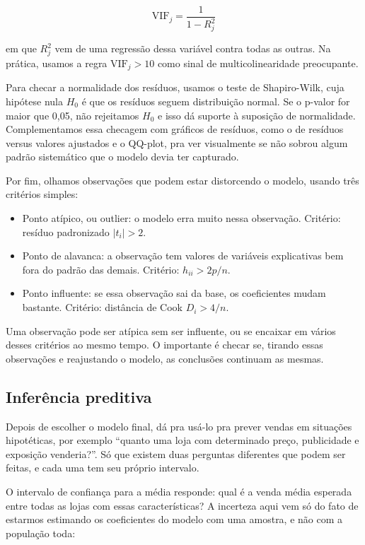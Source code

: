 \documentclass[a4paper]{modeloUFCG} %
\begin{document}
\[
\text{VIF}_j = \frac{1}{1 - R_j^2}
\]

em que \(R_j^2\) vem de uma regressão dessa variável contra todas as outras. Na prática, usamos a regra \(\text{VIF}_j > 10\) como sinal de multicolinearidade preocupante.

Para checar a normalidade dos resíduos, usamos o teste de Shapiro-Wilk, cuja hipótese nula \(H_0\) é que os resíduos seguem distribuição normal. Se o p-valor for maior que 0,05, não rejeitamos \(H_0\) e isso dá suporte à suposição de normalidade. Complementamos essa checagem com gráficos de resíduos, como o de resíduos versus valores ajustados e o QQ-plot, pra ver visualmente se não sobrou algum padrão sistemático que o modelo devia ter capturado.

Por fim, olhamos observações que podem estar distorcendo o modelo, usando três critérios simples:

\begin{itemize}
\tightlist
\item
  Ponto atípico, ou outlier: o modelo erra muito nessa observação. Critério: resíduo padronizado \(|t_i| > 2\).
\item
  Ponto de alavanca: a observação tem valores de variáveis explicativas bem fora do padrão das demais. Critério: \(h_{ii} > 2p/n\).
\item
  Ponto influente: se essa observação sai da base, os coeficientes mudam bastante. Critério: distância de Cook \(D_i > 4/n\).
\end{itemize}

Uma observação pode ser atípica sem ser influente, ou se encaixar em vários desses critérios ao mesmo tempo. O importante é checar se, tirando essas observações e reajustando o modelo, as conclusões continuam as mesmas.

\subsection{Inferência preditiva}\label{inferuxeancia-preditiva}

Depois de escolher o modelo final, dá pra usá-lo pra prever vendas em situações hipotéticas, por exemplo ``quanto uma loja com determinado preço, publicidade e exposição venderia?''. Só que existem duas perguntas diferentes que podem ser feitas, e cada uma tem seu próprio intervalo.

O intervalo de confiança para a média responde: qual é a venda média esperada entre todas as lojas com essas características? A incerteza aqui vem só do fato de estarmos estimando os coeficientes do modelo com uma amostra, e não com a população toda:
\end{document}

